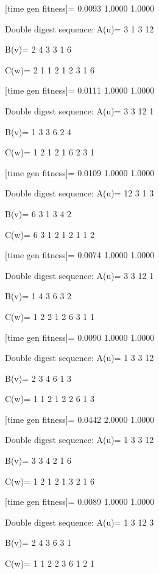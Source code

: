 [time gen fitness]=
    0.0093    1.0000    1.0000

Double digest sequence:
A(u)=
     3     1     3    12

B(v)=
     2     4     3     3     1     6

C(w)=
     2     1     1     2     1     2     3     1     6

[time gen fitness]=
    0.0111    1.0000    1.0000

Double digest sequence:
A(u)=
     3     3    12     1

B(v)=
     1     3     3     6     2     4

C(w)=
     1     2     1     2     1     6     2     3     1

[time gen fitness]=
    0.0109    1.0000    1.0000

Double digest sequence:
A(u)=
    12     3     1     3

B(v)=
     6     3     1     3     4     2

C(w)=
     6     3     1     2     1     2     1     1     2

[time gen fitness]=
    0.0074    1.0000    1.0000

Double digest sequence:
A(u)=
     3     3    12     1

B(v)=
     1     4     3     6     3     2

C(w)=
     1     2     2     1     2     6     3     1     1

[time gen fitness]=
    0.0090    1.0000    1.0000

Double digest sequence:
A(u)=
     1     3     3    12

B(v)=
     2     3     4     6     1     3

C(w)=
     1     1     2     1     2     2     6     1     3

[time gen fitness]=
    0.0442    2.0000    1.0000

Double digest sequence:
A(u)=
     1     3     3    12

B(v)=
     3     3     4     2     1     6

C(w)=
     1     2     1     2     1     3     2     1     6

[time gen fitness]=
    0.0089    1.0000    1.0000

Double digest sequence:
A(u)=
     1     3    12     3

B(v)=
     2     4     3     6     3     1

C(w)=
     1     1     2     2     3     6     1     2     1

